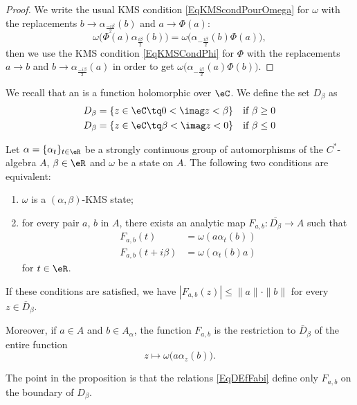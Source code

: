 \begin{proof}
	We write the usual KMS condition \eqref{EqKMScondPourOmega} for $\omega$ with the replacements $b\to \alpha_{\frac{ -i\beta }{2}}(b)$ and $a\to \Phi(a)$:
	\begin{equation}
		\omega\big( \Phi(a)\alpha_{\frac{ i\beta }{2}}(b) \big)=\omega\big( \alpha_{-\frac{ i\beta }{2}}(b)\Phi(a) \big),
	\end{equation}
	then we use the KMS condition \eqref{EqKMSCondPhi} for $\Phi$ with the replacements $a\to b$ and $b\to\alpha_{\frac{ -i\beta }{2}}(a)$ in order to get $\omega\big( \alpha_{-\frac{ i\beta }{2}}(a)\Phi(b) \big)$.
\end{proof}

We recall that an  is a function holomorphic over $\eC$. We define the set $D_{\beta}$ as
\begin{equation}
	\begin{aligned}[]
		D_{\beta}&=\{ z\in\eC\tq 0<\imag z<\beta \}	&\text{if }\beta\geq 0\\
		D_{\beta}&=\{ z\in\eC\tq \beta<\imag z<0 \}	&\text{if }\beta\leq 0
	\end{aligned}
\end{equation}

\begin{proposition}
	Let $\alpha=\{ \alpha_t \}_{t\in\eR}$ be a strongly continuous group of automorphisms of the $C^*$-algebra $A$, $\beta\in\eR$ and $\omega$ be a state on $A$. The following two conditions are equivalent:
	\begin{enumerate}
		\item
			$\omega$ is a $(\alpha,\beta)$-KMS state;
		\item
			for every pair $a$, $b$ in $A$, there exists an analytic map $F_{a,b}\colon \overline{ D_{\beta} }\to A$ such that
			\begin{subequations}		\label{EqDEfFabi}
				\begin{align}
					F_{a,b}(t)&=\omega(a\alpha_t(b))\\
					F_{a,b}(t+i\beta)&=\omega(\alpha_t(b)a)
				\end{align}
			\end{subequations}
			for $t\in\eR$.
	\end{enumerate}
	If these conditions are satisfied, we have $| F_{a,b}(z) |\leq\| a \|\cdot\| b \|$ for every $z\in\overline{ D }_{\beta}$.

	Moreover, if $a\in A$ and $b\in A_{\alpha}$, the function $F_{a,b}$ is the restriction to $\bar D_{\beta}$ of the entire function
	\begin{equation}
		z\mapsto\omega\big( a\alpha_z(b) \big).
	\end{equation}
\end{proposition}
The point in the proposition is that the relations \eqref{EqDEfFabi} define only $F_{a,b}$ on the boundary of $D_{\beta}$.

